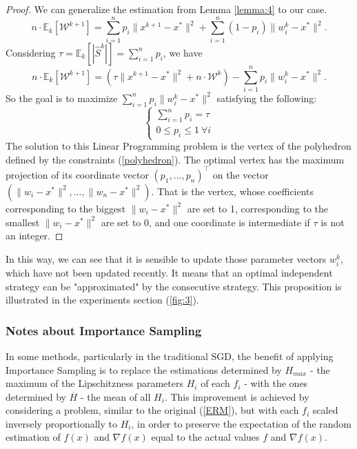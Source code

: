 \documentclass{article}
\theoremstyle{definition}
\theoremstyle{assumption}
\theoremstyle{lemma}
\theoremstyle{theorem}
\theoremstyle{proposition}
\begin{document}
	\begin{proof}
		We can generalize the estimation from Lemma \ref{lemma:4} to our case.
		\begin{equation}
			n \cdot \mathbb E_k[\mathcal W^{k+1}] = \sum \limits_{i=1}^n p_i  \| x^{k+1} - x^* \|^2 + \sum \limits_{i=1}^n \left(1 - p_i \right) \|w_i^k - x^*\|^2.
		\end{equation}
		Considering $\tau = \mathbb E_k[|\hat S^k|] = \sum \limits_{i=1}^n p_i$, we have
		\begin{equation}
			n \cdot \mathbb E_k[\mathcal W^{k+1}] = \left( \tau  \| x^{k+1} - x^* \|^2 + n \cdot \mathcal W^k \right) - \sum \limits_{i=1}^n p_i \|w_i^k - x^*\|^2.
		\end{equation}
		So the goal is to maximize $\sum \limits_{i=1}^n p_i \|w_i^k - x^*\|^2$ satisfying the following:
		\begin{equation} \label{polyhedron}
			\begin{cases}
			\sum \limits_{i=1}^n p_i = \tau \\
			0 \leqslant p_i \leqslant 1\ \forall i
			\end{cases}
		\end{equation}
		The solution to this Linear Programming problem is the vertex of the polyhedron defined by the constraints (\ref{polyhedron}). The optimal vertex has the maximum projection of its coordinate vector $(p_1, ..., p_n)^\top$ on the vector $(\|w_i - x^*\|^2, ..., \|w_n - x^*\|^2)$. That is the vertex, whose coefficients corresponding to the biggest $\|w_i - x^*\|^2$ are set to 1, corresponding to the smallest $\|w_i - x^*\|^2$ are set to 0, and one coordinate is intermediate if $\tau$ is not an integer.
	\end{proof}

	In this way, we can see that it is sensible to update those parameter vectors $w_i^k$, which have not been updated recently. It means that an optimal independent strategy can be "approximated" by the consecutive strategy. This proposition is illustrated in the experiments section (\ref{fig:3}).
	

	\subsubsection{Notes about Importance Sampling}

	In some methods, particularly in the traditional SGD, the benefit of applying Importance Sampling is to replace the estimations determined by $H_{max}$ - the maximum of the Lipschitzness parameters $H_i$ of each $f_i$ - with the ones determined by $\overline H$ - the mean of all $H_i$. This improvement is achieved by considering a problem, similar to the original (\ref{ERM}), but with each $f_i$ scaled inversely proportionally to $H_i$, in order to preserve the expectation of the random estimation of $f(x)$ and $\nabla f(x)$ equal to the actual values $f$ and $\nabla f(x)$.
	
\end{document}
